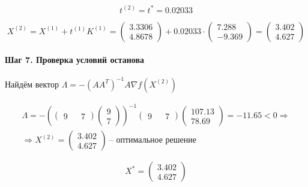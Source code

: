 \begin{equation*}
	t^{(2)} = t^* = 0.02033
\end{equation*}

\begin{equation*}
	X^{(2)} = X^{(1)} + t^{(1)} K^{(1)} = \begin{pmatrix}
		3.3306 \\ 4.8678
	\end{pmatrix}
	+
	0.02033 \cdot \begin{pmatrix} 7.288 \\ -9.369 \end{pmatrix}
	=
	\begin{pmatrix}
		3.402 \\ 4.627
	\end{pmatrix}
\end{equation*}

\paragraph{Шаг 7. Проверка условий останова}

Найдём вектор $\Lambda = - \left( A A^T \right)^{-1} A \nabla f (X^{(2)})$

\begin{equation*}
\begin{aligned}
	\Lambda = -\left( \begin{pmatrix} 9 && 7 \end{pmatrix} \begin{pmatrix} 9 \\ 7 \end{pmatrix} \right)^{-1} \begin{pmatrix} 9 && 7 \end{pmatrix} \begin{pmatrix} 107.13 \\ 78.69 \end{pmatrix} = - 11.65 < 0 \Rightarrow \\ \Rightarrow X^{(2)} = \begin{pmatrix}
		3.402 \\ 4.627
	\end{pmatrix}\ \text{-- оптимальное решение}
\end{aligned}
\end{equation*}

\begin{equation*}
	X^{*} = \begin{pmatrix}
		3.402 \\ 4.627
	\end{pmatrix}
\end{equation*}

